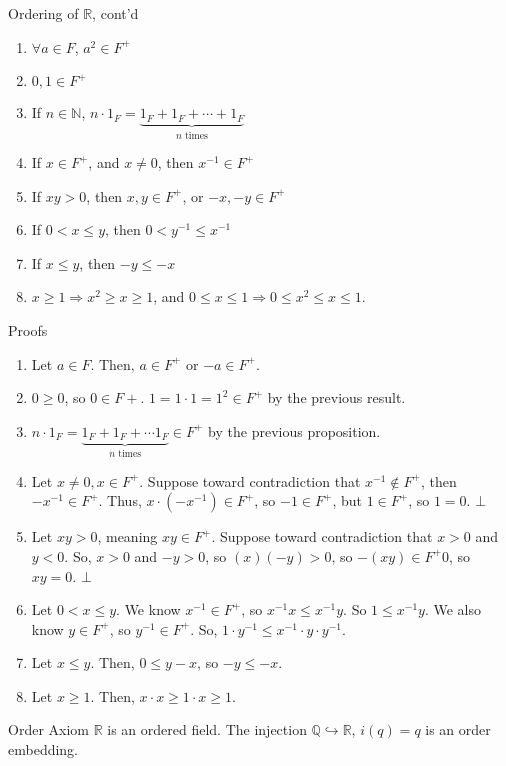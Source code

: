 \documentclass[8pt]{extarticle}
\newcommand{\N}{\mathbb{N}}
\newcommand{\Q}{\mathbb{Q}}
\newcommand{\R}{\mathbb{R}}
\begin{document}
\begin{problem}{Ordering of $\R$, cont'd}
\begin{description}
    \end{description}
    \begin{enumerate}[(1)]
      \item $\forall a\in F$, $a^{2}\in F^+$
      \item $0,1\in F^+$
      \item If $n\in \N$, $n\cdot 1_{F} = \underbrace{1_F + 1_F + \cdots + 1_F}_{\text{$n$ times}}$
      \item If $x\in F^+$, and $x\neq 0$, then $x^{-1}\in F^+$
      \item If $xy > 0$, then $x,y\in F^+$, or $-x,-y\in F^{+}$
      \item If $0 < x \leq y$, then $0 < y^{-1} \leq x^{-1}$
      \item If $x\leq y$, then $-y\leq -x$
      \item $x\geq 1 \Rightarrow x^2 \geq x \geq 1$, and $0\leq x\leq 1 \Rightarrow 0 \leq x^2 \leq x \leq 1$.
    \end{enumerate}
    \begin{problem}{Proofs}
      \begin{enumerate}[(1)]
        \item Let $a\in F$. Then, $a\in F^+$ or $-a\in F^+$.
        \item $0\geq 0$, so $0\in F+$. $1 = 1\cdot 1 = 1^2 \in F^+$ by the previous result.
        \item $n\cdot 1_F = \underbrace{1_F + 1_F + \cdots 1_F}_{\text{$n$ times}}\in F^+$ by the previous proposition.
        \item Let $x\neq 0, x\in F^+$. Suppose toward contradiction that $x^{-1}\notin F^+$, then $-x^{-1}\in F^+$. Thus, $x\cdot(-x^{-1})\in F^+$, so $-1\in F^+$, but $1\in F^+$, so $1 = 0$. $\bot$
        \item Let $xy > 0$, meaning $xy\in F^+$. Suppose toward contradiction that $x>0$ and $y<0$. So, $x>0$ and $-y > 0$, so $(x)(-y) > 0$, so $-(xy) \in F^+ 0$, so $xy = 0$. $\bot$
        \item Let $0 < x \leq y$. We know $x^{-1}\in F^+$, so $x^{-1}x \leq x^{-1}y$. So $1\leq x^{-1}y$. We also know $y\in F^+$, so $y^{-1}\in F^+$. So, $1\cdot y^{-1}\leq x^{-1}\cdot y\cdot y^{-1}$. 
        \item Let $x\leq y$. Then, $0\leq y-x$, so $-y\leq -x$.
        \item Let $x\geq 1$. Then, $x\cdot x \geq 1\cdot x \geq 1$.
      \end{enumerate}
    \end{problem}
    \begin{problem}{Order Axiom}
      $\R$ is an ordered field. The injection $\Q\hookrightarrow \R$, $i(q) = q$ is an order embedding.
    \end{problem}
  \end{problem}
\end{document}

